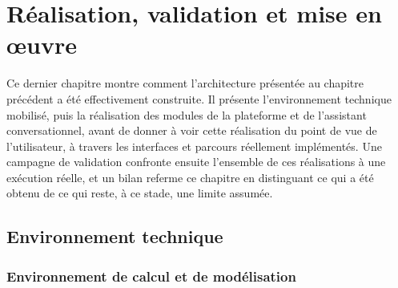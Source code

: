 \chapter{Réalisation, validation et mise en œuvre}

Ce dernier chapitre montre comment l'architecture présentée au chapitre précédent a été effectivement construite. Il présente l'environnement technique mobilisé, puis la réalisation des modules de la plateforme et de l'assistant conversationnel, avant de donner à voir cette réalisation du point de vue de l'utilisateur, à travers les interfaces et parcours réellement implémentés. Une campagne de validation confronte ensuite l'ensemble de ces réalisations à une exécution réelle, et un bilan referme ce chapitre en distinguant ce qui a été obtenu de ce qui reste, à ce stade, une limite assumée.

\section{Environnement technique}

\subsection{Environnement de calcul et de modélisation}

